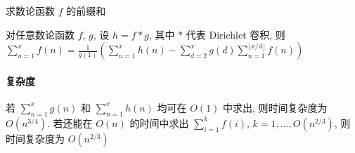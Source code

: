 求数论函数 \(f\) 的前缀和

对任意数论函数 \(f\), \(g\), 设 \(h=f*g\), 其中 \(*\) 代表 Dirichlet 卷积, 则 \(\displaystyle\sum_{n=1}^x f(n)=\frac{1}{g(1)} \left(\sum_{n=1}^x h(n)-\sum_{d=2}^xg(d)\sum_{n=1}^{\lfloor x/d\rfloor}f(n)\right)\)

\paragraph{复杂度} 若 \(\sum_{n=1}^x g(n)\) 和 \(\sum_{n=1}^x h(n)\) 均可在 \(O(1)\) 中求出, 则时间复杂度为 \(O\left(n^{3/4}\right)\). 若还能在 \(O(n)\) 的时间中求出 \(\sum_{i=1}^k f(i)\), \(k=1,\dots,O\left(n^{2/3}\right)\), 则时间复杂度为 \(O\left(n^{2/3}\right)\)
